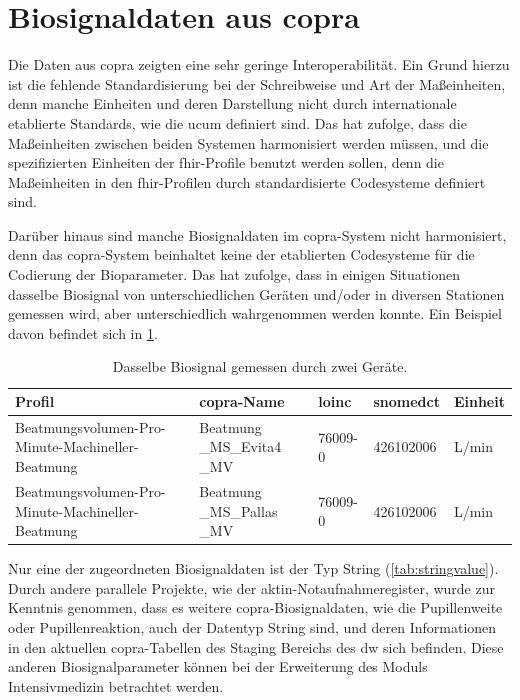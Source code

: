\section{Biosignaldaten aus \acs{copra}} \label{sec:configvarcopradiscu}

Die Daten aus \ac{copra} zeigten eine sehr geringe Interoperabilität. Ein Grund hierzu ist die fehlende Standardisierung bei der Schreibweise und Art der Maßeinheiten, denn manche Einheiten und deren Darstellung nicht durch internationale etablierte Standards, wie die \ac{ucum} definiert sind. Das hat zufolge, dass die Maßeinheiten zwischen beiden Systemen harmonisiert werden müssen, und die spezifizierten Einheiten der \ac{fhir}-Profile benutzt werden sollen, denn die Maßeinheiten in den \ac{fhir}-Profilen durch standardisierte Codesysteme definiert sind. 

Darüber hinaus sind manche Biosignaldaten im \ac{copra}-System nicht harmonisiert, denn das \ac{copra}-System beinhaltet keine der etablierten Codesysteme für die Codierung der Bioparameter. Das hat zufolge, dass in einigen Situationen dasselbe Biosignal von unterschiedlichen Geräten und/oder in diversen Stationen gemessen wird, aber unterschiedlich wahrgenommen werden konnte. Ein Beispiel davon befindet sich in \ref{tab:sameprofilbiosig}.

\clearpage

 \begin{table}[ht]
 	\centering 
 	\caption[Dasselbe Biosignal gemessen durch zwei Geräte]{Dasselbe Biosignal gemessen durch zwei Geräte.}
 	\label{tab:sameprofilbiosig}
 	\begin{tabular}{|p{3.5cm}|p{2.4cm}|l|l|l|}
 		\hline
 		\rowcolor{lightgray} Profil & \ac{copra}-Name & \acs{loinc} & \ac{snomedct} & Einheit \\ \hline
 		Beatmungsvolumen-Pro-Minute-Machineller-Beatmung & Beatmung \_MS\_Evita4 \_MV & 76009-0 & 426102006 & L/min \\ \hline
 		Beatmungsvolumen-Pro-Minute-Machineller-Beatmung & Beatmung \_MS\_Pallas \_MV & 76009-0 & 426102006 & L/min \\ \hline
 	\end{tabular}
 \end{table}

Nur eine der zugeordneten Biosignaldaten ist der Typ String (\ref{tab:stringvalue}). Durch andere parallele Projekte, wie der \ac{aktin}-Notaufnahmeregister, wurde zur Kenntnis genommen, dass es weitere \ac{copra}-Biosignaldaten, wie die Pupillenweite oder Pupillenreaktion, auch der Datentyp String sind, und deren Informationen in den aktuellen \ac{copra}-Tabellen des Staging Bereichs des \ac{dw} sich befinden. Diese anderen Biosignalparameter können bei der Erweiterung des Moduls \glqq Intensivmedizin\grqq{} betrachtet werden.


